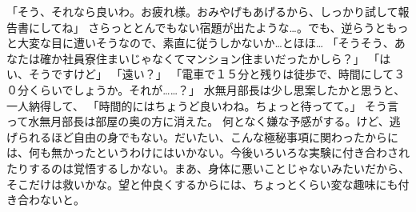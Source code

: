 「そう、それなら良いわ。お疲れ様。おみやげもあげるから、しっかり試して報告書にしてね」
さらっととんでもない宿題が出たような…。でも、逆らうともっと大変な目に遭いそうなので、素直に従うしかないか…とほほ…
「そうそう、あなたは確か社員寮住まいじゃなくてマンション住まいだったかしら？」
「はい、そうですけど」
「遠い？」
「電車で１５分と残りは徒歩で、時間にして３０分くらいでしょうか。それが……？」
水無月部長は少し思案したかと思うと、一人納得して、
「時間的にはちょうど良いわね。ちょっと待ってて。」
そう言って水無月部長は部屋の奥の方に消えた。
何となく嫌な予感がする。けど、逃げられるほど自由の身でもない。だいたい、こんな極秘事項に関わったからには、何も無かったというわけにはいかない。今後いろいろな実験に付き合わされたりするのは覚悟するしかない。まあ、身体に悪いことじゃないみたいだから、そこだけは救いかな。望と仲良くするからには、ちょっとくらい変な趣味にも付き合わないと。

